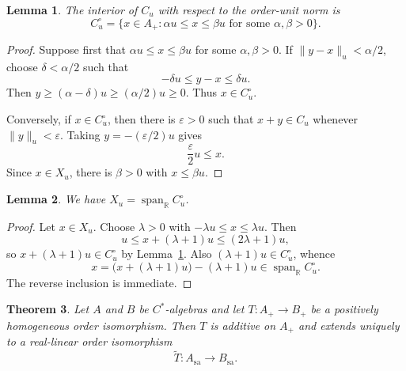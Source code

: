 \documentclass[10pt,a4paper]{amsart}
\newtheorem{theorem}{Theorem}[section]
\newtheorem{lemma}[theorem]{Lemma}
\newcommand{\sa}{\mathrm{sa}}
\begin{document}
\begin{lemma}\label{lem:interior}
The interior of $C_u$ with respect to the order-unit norm is
\[
 C_u^\circ
 =\{x\in A_+: \alpha u\le x\le\beta u
       \text{ for some }\alpha,\beta>0\}.
\]
\end{lemma}

\begin{proof}
Suppose first that $\alpha u\le x\le\beta u$ for some
$\alpha,\beta>0$.  If $\|y-x\|_u<\alpha/2$, choose
$\delta<\alpha/2$ such that
\[
        -\delta u\le y-x\le\delta u.
\]
Then $y\ge(\alpha-\delta)u\ge(\alpha/2)u\ge0$.  Thus
$x\in C_u^\circ$.

Conversely, if $x\in C_u^\circ$, then there is $\varepsilon>0$ such
that $x+y\in C_u$ whenever $\|y\|_u<\varepsilon$.  Taking
$y=-(\varepsilon/2)u$ gives
\[
 \frac\varepsilon2u\le x.
\]
Since $x\in X_u$, there is $\beta>0$ with $x\le\beta u$.
\end{proof}

\begin{lemma}\label{lem:span-interior}
We have $X_u=\operatorname{span}_{\mathbb R} C_u^\circ$. 
\end{lemma}

\begin{proof}
Let $x\in X_u$.  Choose $\lambda>0$ with
$-\lambda u\le x\le\lambda u$.  Then
\[
 u\le x+(\lambda+1)u\le(2\lambda+1)u,
\]
so $x+(\lambda+1)u\in C_u^\circ$ by
Lemma~\ref{lem:interior}.  Also $(\lambda+1)u\in C_u^\circ$, whence
\[
 x=\bigl(x+(\lambda+1)u\bigr)-(\lambda+1)u
 \in\operatorname{span}_{\mathbb R}C_u^\circ.
\]
The reverse inclusion is immediate.
\end{proof}


\begin{theorem}\label{thm:extension}
Let $A$ and $B$ be $C^*$-algebras and let $ T: A_+\to B_+$ be a positively homogeneous order isomorphism. 
Then $T$ is additive on $A_+$ and extends uniquely to a real-linear
order isomorphism
\[
 \widetilde T:A_{\sa}\longrightarrow B_{\sa}.
\]
\end{theorem}
\end{document}
